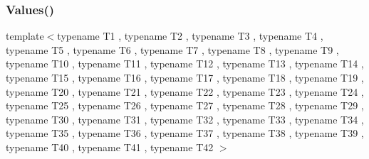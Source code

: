 \mbox{\label{namespacetesting_a0951fc3989cde27914791eb120f8f01c}} 
\subsubsection{\texorpdfstring{Values()}{Values()}\hspace{0.1cm}{\footnotesize\ttfamily [43/51]}}
{\footnotesize\ttfamily template$<$typename T1 , typename T2 , typename T3 , typename T4 , typename T5 , typename T6 , typename T7 , typename T8 , typename T9 , typename T10 , typename T11 , typename T12 , typename T13 , typename T14 , typename T15 , typename T16 , typename T17 , typename T18 , typename T19 , typename T20 , typename T21 , typename T22 , typename T23 , typename T24 , typename T25 , typename T26 , typename T27 , typename T28 , typename T29 , typename T30 , typename T31 , typename T32 , typename T33 , typename T34 , typename T35 , typename T36 , typename T37 , typename T38 , typename T39 , typename T40 , typename T41 , typename T42 $>$ \\
}
